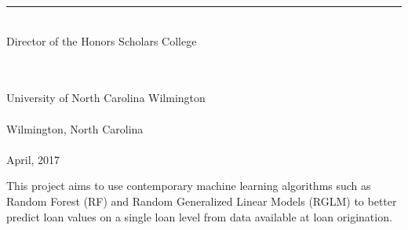 \documentclass[12 pt]{uncw_thesis}
\theoremstyle{plain}
\theoremstyle{remark}
\theoremstyle{definition}
\begin{document}
\begin{singlespace}
    \rule{7.5cm}{.01in}\\
     Director of the Honors Scholars College \\
\begin{center}   
    \hskip 1pt \\
    \hskip 1pt \\    %
    University of North Carolina Wilmington\\
    \hskip 1pt \\    %
    Wilmington, North Carolina \\
    \hskip 1pt \\    %
    April, 2017\\
\end{center}
\end{singlespace}
\newpage

%
%

\newpage
\pagestyle{plain}
\begin{center}
\tableofcontents
\end{center}


%
%

This project aims to use contemporary machine learning algorithms such as Random Forest (RF) and Random Generalized Linear Models (RGLM) to better predict loan values on a single loan level from data available at loan origination.

%
%

%
%

%
%

%
%


%
%
%
%
\newpage
{}
\end{document}
